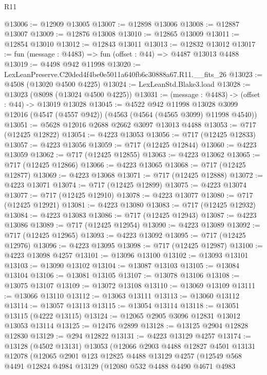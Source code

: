 \begin{lexlean}{R11}
\begin{coremodule}
@13006 := @12909 @13005
@13007 := @12898 @13006
@13008 := @12887 @13007
@13009 := @12876 @13008
@13010 := @12865 @13009
@13011 := @12854 @13010
@13012 := @12843 @13011
@13013 := @12832 @13012
@13017 := fun (message : @4483) => fun (offset : @44) => @4487 @13013 @4488
@13019 := @4498 @942 @11998
@13020 := LexLeanPreserve.C20ded4f4be0e5011a640fb6c30888a67.R11.__fits_26
@13023 := @4508 (@13020 @4500 @4225)
@13024 := LexLeanStd.Blake3.load
@13028 := @13023 (@8098 (@13024 @4500 @4225))
@13031 := (message : @4483) -> (offset : @44) -> @13019 @13028
@13045 := @4522
    @942
    @11998
    @13028
    @3099
    @12016
    (@4547 (@4557 @942))
    (@4563 (@4564 (@4565 @3099) @11998 @4540))
@13051 := @5628 @12016 @2688 @2662 @3097 @13013 @4488
@13053 := @717 (@12425 @12822)
@13054 := @4223 @13053
@13056 := @717 (@12425 @12833)
@13057 := @4223 @13056
@13059 := @717 (@12425 @12844)
@13060 := @4223 @13059
@13062 := @717 (@12425 @12855)
@13063 := @4223 @13062
@13065 := @717 (@12425 @12866)
@13066 := @4223 @13065
@13068 := @717 (@12425 @12877)
@13069 := @4223 @13068
@13071 := @717 (@12425 @12888)
@13072 := @4223 @13071
@13074 := @717 (@12425 @12899)
@13075 := @4223 @13074
@13077 := @717 (@12425 @12910)
@13078 := @4223 @13077
@13080 := @717 (@12425 @12921)
@13081 := @4223 @13080
@13083 := @717 (@12425 @12932)
@13084 := @4223 @13083
@13086 := @717 (@12425 @12943)
@13087 := @4223 @13086
@13089 := @717 (@12425 @12954)
@13090 := @4223 @13089
@13092 := @717 (@12425 @12965)
@13093 := @4223 @13092
@13095 := @717 (@12425 @12976)
@13096 := @4223 @13095
@13098 := @717 (@12425 @12987)
@13100 := @4223 @13098 @4257
@13101 := @13096 @13100
@13102 := @13093 @13101
@13103 := @13090 @13102
@13104 := @13087 @13103
@13105 := @13084 @13104
@13106 := @13081 @13105
@13107 := @13078 @13106
@13108 := @13075 @13107
@13109 := @13072 @13108
@13110 := @13069 @13109
@13111 := @13066 @13110
@13112 := @13063 @13111
@13113 := @13060 @13112
@13114 := @13057 @13113
@13115 := @13054 @13114
@13118 := @13051 @13115 (@4222 @13115)
@13124 := @12065 @2905 @3096 @12831 @13012 @13053 @13114
@13125 := @12476 @2899
@13128 := @13125 @2904 @12828 @12830
@13129 := @294 @12822
@13131 := @4223 @13129 @4257
@13174 := @13128
    (@4502 @13131)
    @13053
    (@12066
      @2903
      @4488
      @12827
      @4501
      @13131
      @12078
      (@12065
        @2901
        @123
        @12825
        @4488
        @13129
        @4257
        (@12549
          @568
          @4491
          @12824
          @4984
          @13129
          (@12080
            @532
            @4488
            @4490
            @4671
            @4983

\end{coremodule}
\end{lexlean}
